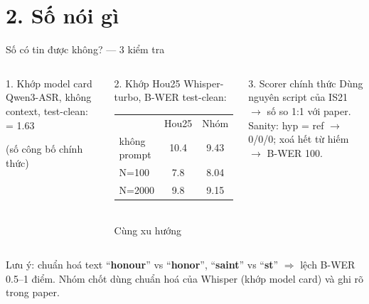 \documentclass[aspectratio=169,xcolor=table]{beamer}
\newcommand{\cmark}{\textcolor{GoodGreen}{\ding{51}}}
\begin{document}
\section{2. Số nói gì}
\begin{frame}{Số có tin được không? --- 3 kiểm tra}
\begin{columns}[T,onlytextwidth]
\begin{block}{1. Khớp model card}
\small Qwen3-ASR, không context, test-clean:\\[3pt]
 = 1.63 \cmark\\[2pt]
\raggedright\footnotesize (số công bố chính thức)
\end{block}
\begin{block}{2. Khớp Hou25}
\footnotesize Whisper-turbo, B-WER test-clean:\\[2pt]
\renewcommand{\arraystretch}{1.1}
\begin{tabular}{@{}lcc@{}}
& Hou25 & Nhóm\\
không prompt & 10.4 & 9.43\\
N=100 & 7.8 & 8.04\\
N=2000 & 9.8 & 9.15\\
\end{tabular}\\[2pt]
Cùng xu hướng \cmark
\end{block}
\begin{block}{3. Scorer chính thức}
\small Dùng nguyên script của IS21 $\rightarrow$ số so 1:1 với paper.\\[3pt]
\footnotesize Sanity: hyp = ref $\rightarrow$ 0/0/0; xoá hết từ hiếm $\rightarrow$ B-WER 100.
\end{block}
\end{columns}
\vspace{0.25cm}
\begin{alertblock}{Lưu ý: chuẩn hoá text}
\small ``\textbf{honour}'' vs ``\textbf{honor}'', ``\textbf{saint}'' vs ``\textbf{st}'' $\Rightarrow$ lệch B-WER 0.5--1 điểm. Nhóm chốt dùng chuẩn hoá của Whisper (khớp model card) và ghi rõ trong paper.
\end{alertblock}
\end{frame}
\end{document}
